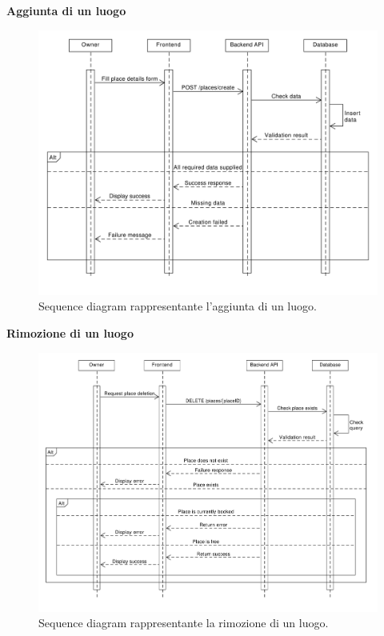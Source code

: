 \documentclass[9pt]{extarticle}
\begin{document}
\newpage

\textbf{Aggiunta di un luogo}
\begin{figure}[!htb]
	\centering
	\includegraphics[width=\linewidth]{./images/SequenceDiagramAddPlace.pdf}
	\caption{Sequence diagram rappresentante l'aggiunta di un luogo.}
	\label{fig:SeqDiagAddPlace}
\end{figure}

\newpage

\textbf{Rimozione di un luogo}
\begin{figure}[!htb]
	\centering
	\includegraphics[width=\linewidth]{./images/SequenceDiagramPlaceDeletion.pdf}
	\caption{Sequence diagram rappresentante la rimozione di un luogo.}
	\label{fig:SeqDiagRemovePlace}
\end{figure}
\end{document}
